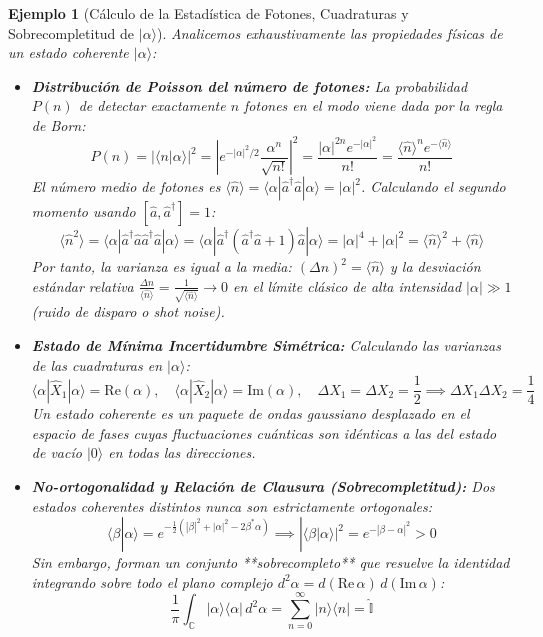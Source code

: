 \documentclass[11pt,a4paper]{book}
\newtheorem{ejemplo}{Ejemplo}[chapter]
\begin{document}
\begin{ejemplo}[Cálculo de la Estadística de Fotones, Cuadraturas y Sobrecompletitud de $|\alpha\rangle$]
Analicemos exhaustivamente las propiedades físicas de un estado coherente $|\alpha\rangle$:
\begin{itemize}
    \item \textbf{Distribución de Poisson del número de fotones:} La probabilidad $P(n)$ de detectar exactamente $n$ fotones en el modo viene dada por la regla de Born:
    \begin{equation}
    P(n) = |\langle n | \alpha \rangle|^2 = \left| e^{-|\alpha|^2/2} \frac{\alpha^n}{\sqrt{n!}} \right|^2 = \frac{|\alpha|^{2n} e^{-|\alpha|^2}}{n!} = \frac{\langle \hat{n} \rangle^n e^{-\langle \hat{n} \rangle}}{n!}
    \end{equation}
    El número medio de fotones es $\langle \hat{n} \rangle = \langle \alpha | \hat{a}^\dagger \hat{a} | \alpha \rangle = |\alpha|^2$. Calculando el segundo momento usando $[\hat{a}, \hat{a}^\dagger]=1$:
    \[
    \langle \hat{n}^2 \rangle = \langle \alpha | \hat{a}^\dagger \hat{a} \hat{a}^\dagger \hat{a} | \alpha \rangle = \langle \alpha | \hat{a}^\dagger (\hat{a}^\dagger \hat{a} + 1) \hat{a} | \alpha \rangle = |\alpha|^4 + |\alpha|^2 = \langle \hat{n} \rangle^2 + \langle \hat{n} \rangle
    \]
    Por tanto, la varianza es igual a la media: $(\Delta n)^2 = \langle \hat{n} \rangle$ y la desviación estándar relativa $\frac{\Delta n}{\langle \hat{n} \rangle} = \frac{1}{\sqrt{\langle \hat{n} \rangle}} \to 0$ en el límite clásico de alta intensidad $|\alpha| \gg 1$ (ruido de disparo o \textit{shot noise}).
    \item \textbf{Estado de Mínima Incertidumbre Simétrica:} Calculando las varianzas de las cuadraturas en $|\alpha\rangle$:
    \[
    \langle \alpha | \hat{X}_1 | \alpha \rangle = \text{Re}(\alpha), \quad \langle \alpha | \hat{X}_2 | \alpha \rangle = \text{Im}(\alpha), \quad \Delta X_1 = \Delta X_2 = \frac{1}{2} \implies \Delta X_1 \Delta X_2 = \frac{1}{4}
    \]
    Un estado coherente es un paquete de ondas gaussiano desplazado en el espacio de fases cuyas fluctuaciones cuánticas son idénticas a las del estado de vacío $|0\rangle$ en todas las direcciones.
    \item \textbf{No-ortogonalidad y Relación de Clausura (Sobrecompletitud):} Dos estados coherentes distintos nunca son estrictamente ortogonales:
    \begin{equation}
    \langle \beta | \alpha \rangle = e^{-\frac{1}{2}(|\beta|^2 + |\alpha|^2 - 2\beta^* \alpha)} \implies |\langle \beta | \alpha \rangle|^2 = e^{-|\beta - \alpha|^2} > 0
    \end{equation}
    Sin embargo, forman un conjunto **sobrecompleto** que resuelve la identidad integrando sobre todo el plano complejo $d^2\alpha = d(\text{Re}\,\alpha)\,d(\text{Im}\,\alpha)$:
    \begin{equation}
    \frac{1}{\pi} \int_{\mathbb{C}} |\alpha\rangle\langle\alpha| \, d^2\alpha = \sum_{n=0}^{\infty} |n\rangle\langle n| = \hat{\mathbb{I}}
    \end{equation}
\end{itemize}
\end{ejemplo}
\end{document}
